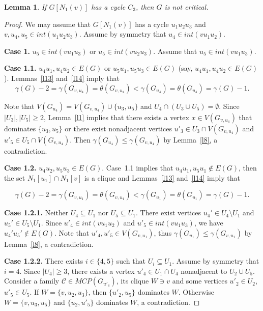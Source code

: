 \documentclass[12pt]{article}
\newtheorem{lemma}{Lemma}
\begin{document}
\begin{lemma}\label{l30}
If $G[N_1(v)]$ has a cycle $C_3$, then $G$ is not critical.
\end{lemma}

\begin{proof}

We may assume that $G[N_1(v)]$ has a cycle $u_1u_2u_3$ and $v,u_4,u_5 \in int(u_1u_2u_3)$. Assume by symmetry that $u_4 \in int(vu_1u_2)$.

\textbf{Case 1.} $u_5 \in int(vu_1u_3)$ or $u_5 \in int(vu_2u_3)$. Assume that $u_5 \in int(vu_1u_3)$.

\textbf{Case 1.1.} $u_4u_1,u_4u_2 \in E(G)$ or $u_5u_1,u_5u_3 \in E(G)$ (say, $u_4u_1,u_4u_2 \in E(G)$). Lemmas~\ref{l13} and~\ref{l14} imply that 
$$\gamma(G) - 2 = \gamma(G_{v,u_4}) = \theta(G_{v,u_4}) < \gamma(G_{u_4}) = \theta(G_{u_4}) = \gamma(G) - 1.$$ 

Note that $V(G_{u_4}) = V(G_{v,u_4}) \cup \{u_3,u_5\}$ and $U_4 \cap (U_3 \cup U_5) = \emptyset$. Since $|U_3|,|U_5| \geq 2$, Lemma~\ref{l1} implies that there exists a vertex $x \in V(G_{v,u_4})$ that dominates $\{u_3,u_5\}$ or there exist nonadjacent vertices $u'_3 \in U_3 \cap V(G_{v,u_4})$ and $u'_5 \in U_5 \cap V(G_{v,u_4})$. Then $\gamma(G_{u_4}) \leq \gamma(G_{v,u_4})$ by Lemma~\ref{l8}, a contradiction.

\textbf{Case 1.2.} $u_4u_2,u_5u_3 \in E(G)$. Case~1.1 implies that $u_4u_1,u_5u_1 \notin E(G)$, then the set $N_1[u_1] \cap N_1[v]$ is a clique and Lemmas~\ref{l13} and~\ref{l14} imply that

$$\gamma(G) - 2 = \gamma(G_{v,u_1}) = \theta(G_{v,u_1}) < \gamma(G_{u_1}) = \theta(G_{u_1}) = \gamma(G) - 1.$$ 

\textbf{Case 1.2.1.} Neither $U_4 \subseteq U_1$ nor $U_5 \subseteq U_1$. There exist vertices $u_4' \in U_4 \setminus U_1$ and $u_5' \in U_5 \setminus U_1$. Since $u'_4 \in int(vu_1u_2)$ and $u'_5 \in int(vu_1u_3)$, we have $u_4'u_5' \notin E(G)$. Note that $u'_4,u'_5 \in V(G_{v,u_1})$, thus  $\gamma(G_{u_1}) \leq \gamma(G_{v,u_1})$ by Lemma~\ref{l8}, a contradiction.

\textbf{Case 1.2.2.} There exists $i \in \{4,5\}$ such that $U_i \subseteq U_{1}$. Assume by symmetry that $i = 4$. Since $|U_4| \geq 3$, there exists a vertex $u'_4 \in U_1 \cap U_4$ nonadjacent to $U_2 \cup U_5$. Consider a family $\mathcal{C} \in MCP(G_{u'_4})$, its clique $W \ni v$ and some vertices $u'_2 \in U_2$, $u'_5 \in U_5$. If $W = \{v,u_2,u_3\}$, then $\{u'_2,u_5\}$ dominates $W$. Otherwise $W = \{v,u_3,u_5\}$ and $\{u_2,u'_5\}$ dominates $W$, a contradiction.


\end{proof}
\end{document}
